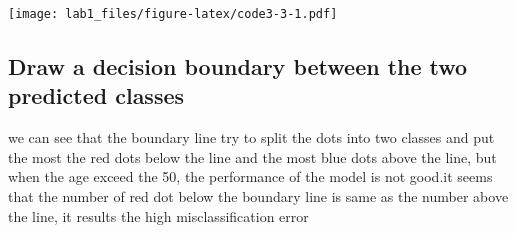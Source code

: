 \documentclass[
]{article}
\newenvironment{Shaded}{\begin{snugshade}}{\end{snugshade}}
\newcommand{\AttributeTok}[1]{\textcolor[rgb]{0.13,0.29,0.53}{#1}}
\newcommand{\FunctionTok}[1]{\textcolor[rgb]{0.13,0.29,0.53}{\textbf{#1}}}
\newcommand{\NormalTok}[1]{#1}
\newcommand{\SpecialCharTok}[1]{\textcolor[rgb]{0.81,0.36,0.00}{\textbf{#1}}}
\newcommand{\StringTok}[1]{\textcolor[rgb]{0.31,0.60,0.02}{#1}}
\begin{document}
\begin{Shaded}
\end{Shaded}

\texttt{[image: lab1\_files/figure-latex/code3-3-1.pdf]}

\subsection{Draw a decision boundary between the two predicted
classes}\label{draw-a-decision-boundary-between-the-two-predicted-classes}

we can see that the boundary line try to split the dots into two classes
and put the most the red dots below the line and the most blue dots
above the line, but when the age exceed the 50, the performance of the
model is not good.it seems that the number of red dot below the boundary
line is same as the number above the line, it results the high
misclassification error
\end{document}
